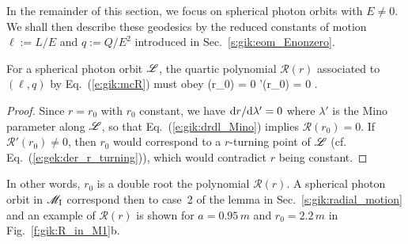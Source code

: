 In the remainder of this section, we focus on spherical photon orbits with $E\neq 0$.
We shall then describe these geodesics by the reduced constants of motion $\ell := L/E$
and $q := Q/E^2$ introduced in Sec.~\ref{s:gik:eom_Enonzero}.

For a spherical photon orbit $\mathscr{L}$,
the quartic polynomial $\mathcal{R}(r)$ associated to $(\ell,q)$ by Eq.~(\ref{e:gik:mcR})
must obey
\be \label{e:gik:R_Rp_r0_zero}
    (r_0) = 0 \qand {}'(r_0) = 0 .
\ee
\begin{proof}
Since $r=r_0$ with $r_0$ constant, we have $\mathrm{d} r/\mathrm{d}\lambda' = 0$ where $\lambda'$ is the Mino parameter along $\mathscr{L}$, so
that Eq.~(\ref{e:gik:drdl_Mino}) implies $\mathcal{R}(r_0) = 0$. If $\mathcal{R}'(r_0) \neq 0$,
then $r_0$ would correspond to a $r$-turning point of $\mathscr{L}$  (cf. Eq.~(\ref{e:gek:der_r_turning})),
which would contradict $r$ being constant.
\end{proof}
In other words, $r_0$ is a double root the polynomial $\mathcal{R}(r)$. A spherical
photon orbit in $\mathscr{M}_{\rm I}$ correspond then to case~2 of the lemma in
Sec.~\ref{s:gik:radial_motion} and an example of $\mathcal{R}(r)$ is shown
for $a=0.95\, m$ and $r_0=2.2\, m$ in Fig.~\ref{f:gik:R_in_M1}b.

